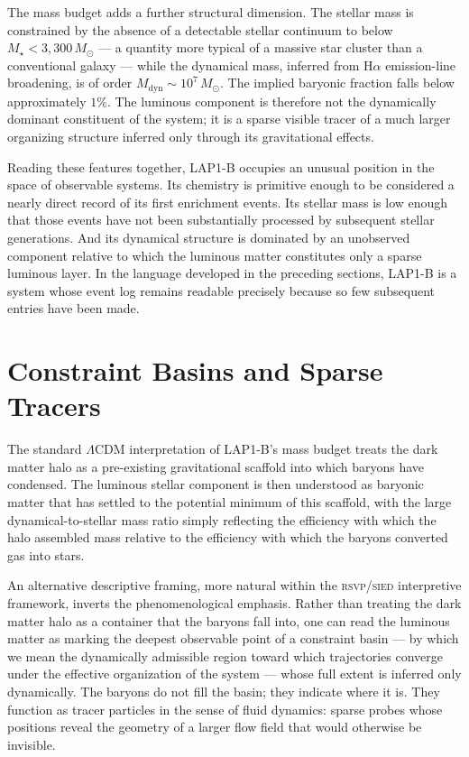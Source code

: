 \documentclass[12pt, a4paper]{article}
\newcommand{\Msun}{M_{\odot}}
\newcommand{\Mstar}{M_{\star}}
\newcommand{\Mdyn}{M_{\mathrm{dyn}}}
\newcommand{\RSVP}{\textsc{rsvp}}
\newcommand{\SIED}{\textsc{sied}}
\theoremstyle{definition}
\begin{document}
The mass budget adds a further structural dimension. The stellar mass is
constrained by the absence of a detectable stellar continuum to below
$\Mstar < 3{,}300\,\Msun$ --- a quantity more typical of a massive star
cluster than a conventional galaxy --- while the dynamical mass, inferred
from H$\alpha$ emission-line broadening, is of order $\Mdyn \sim
10^{7}\,\Msun$. The implied baryonic fraction falls below approximately $1\%$.
The luminous component is therefore not the dynamically dominant constituent
of the system; it is a sparse visible tracer of a much larger organizing
structure inferred only through its gravitational effects.

Reading these features together, LAP1-B occupies an unusual position in the
space of observable systems. Its chemistry is primitive enough to be
considered a nearly direct record of its first enrichment events. Its stellar
mass is low enough that those events have not been substantially processed
by subsequent stellar generations. And its dynamical structure is dominated
by an unobserved component relative to which the luminous matter constitutes
only a sparse luminous layer. In the language developed in the preceding
sections, LAP1-B is a system whose event log remains readable precisely
because so few subsequent entries have been made.

\section{Constraint Basins and Sparse Tracers}
\label{sec:constraint}

The standard $\Lambda$CDM interpretation of LAP1-B's mass budget treats the
dark matter halo as a pre-existing gravitational scaffold into which baryons
have condensed. The luminous stellar component is then understood as baryonic
matter that has settled to the potential minimum of this scaffold, with the
large dynamical-to-stellar mass ratio simply reflecting the efficiency with
which the halo assembled mass relative to the efficiency with which the
baryons converted gas into stars.

An alternative descriptive framing, more natural within the \RSVP{}/\SIED{}
interpretive framework, inverts the phenomenological emphasis. Rather than
treating the dark matter halo as a container that the baryons fall into, one
can read the luminous matter as marking the deepest observable point of a
constraint basin --- by which we mean the dynamically admissible region toward
which trajectories converge under the effective organization of the system ---
whose full extent is inferred only dynamically. The baryons
do not fill the basin; they indicate where it is. They function as tracer
particles in the sense of fluid dynamics: sparse probes whose positions reveal
the geometry of a larger flow field that would otherwise be invisible.
\end{document}
